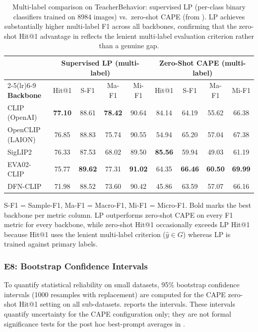 \documentclass[symmetry,article,submit,pdftex,moreauthors]{Definitions/mdpi}
\begin{document}
\begin{table}[H]
\caption{Multi-label comparison on TeacherBehavior: supervised LP (per-class binary classifiers trained on 8984 images) vs.\ zero-shot CAPE (from ). LP achieves substantially higher multi-label F1 across all backbones, confirming that the zero-shot Hit@1 advantage in  reflects the lenient multi-label evaluation criterion rather than a genuine gap.}
\label{tab:linear_probe_ml}
\centering
\small
\setlength{\tabcolsep}{3.5pt}
\begin{tabular}{l cccc cccc}
\toprule
 & \multicolumn{4}{c}{\textbf{Supervised LP (multi-label)}} & \multicolumn{4}{c}{\textbf{Zero-Shot CAPE (multi-label)}} \\
\cmidrule(lr){2-5}\cmidrule(lr){6-9}
\textbf{Backbone} & Hit@1 & S-F1 & Ma-F1 & Mi-F1 & Hit@1 & S-F1 & Ma-F1 & Mi-F1 \\
\midrule
CLIP (OpenAI) & \textbf{77.10} & 88.61 & \textbf{78.42} & 90.64 & 84.14 & 64.19 & 55.62 & 66.38 \\
OpenCLIP (LAION) & 76.85 & 88.83 & 75.74 & 90.55 & 54.94 & 65.20 & 57.04 & 67.38 \\
SigLIP2 & 76.33 & 87.53 & 68.02 & 89.50 & \textbf{85.56} & 59.94 & 49.03 & 61.19 \\
EVA02-CLIP & 75.77 & \textbf{89.62} & 77.31 & \textbf{91.02} & 64.35 & \textbf{66.46} & \textbf{60.50} & \textbf{69.99} \\
DFN-CLIP & 71.98 & 88.52 & 73.60 & 90.42 & 45.86 & 63.59 & 57.07 & 66.16 \\
\bottomrule
\end{tabular}
\vspace{3pt}
{\footnotesize S-F1 = Sample-F1, Ma-F1 = Macro-F1, Mi-F1 = Micro-F1. Bold marks the best backbone per metric column. LP outperforms zero-shot CAPE on every F1 metric for every backbone, while zero-shot Hit@1 occasionally exceeds LP Hit@1 because Hit@1 uses the lenient multi-label criterion ($\hat{y}\in G$) whereas LP is trained against primary labels.}
\end{table}


\subsubsection{E8: Bootstrap Confidence Intervals}
\label{sec:e8_bootstrap}

To quantify statistical reliability on small datasets, 95\% bootstrap confidence intervals (1000 resamples with replacement) are computed for the CAPE zero-shot Hit@1 setting on all sub-datasets.  reports the intervals. These intervals quantify uncertainty for the CAPE configuration only; they are not formal significance tests for the post hoc best-prompt averages in .
\end{document}
